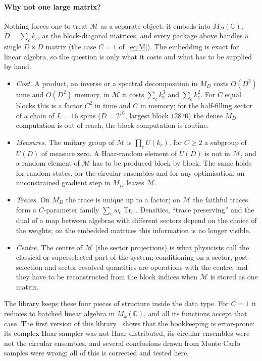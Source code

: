 \documentclass[11pt]{article}
\DeclareMathOperator{\Tr}{Tr}
\newcommand{\C}{\mathbb{C}}
\newcommand{\M}{\mathcal{M}}
\begin{document}
\paragraph{Why not one large matrix?} Nothing forces one to treat $\M$ as a separate object: it embeds into
$M_D(\C)$, $D=\sum_ck_c$, as the block-diagonal matrices, and every package above handles a single $D\times D$
matrix (the case $C=1$ of~\eqref{eq:M}). The embedding is exact for linear algebra, so the question is only what it
costs and what has to be supplied by hand.
\begin{itemize}\itemsep0pt
\item \emph{Cost.} A product, an inverse or a spectral decomposition in $M_D$ costs $O(D^3)$ time and $O(D^2)$ memory,
in $\M$ it costs $\sum_c k_c^3$ and $\sum_c k_c^2$. For $C$ equal blocks this is a factor $C^2$ in time and $C$ in
memory; for the half-filling sector of a chain of $L=16$ spins ($D=2^{16}$, largest block $12870$) the dense $M_D$
computation is out of reach, the block computation is routine.
\item \emph{Measures.} The unitary group of $\M$ is $\prod_cU(k_c)$, for $C\ge2$ a subgroup of $U(D)$ of measure zero. A Haar-random
element of $U(D)$ is not in $\M$, and a random element of $\M$ has to be produced block by block. The same holds for
random states, for the circular ensembles and for any optimisation: an unconstrained gradient step in $M_D$ leaves $\M$.
\item \emph{Traces.} On $M_D$ the trace is unique up to a factor; on $\M$ the faithful traces form a $C$-parameter
family $\sum_cw_c\Tr_c$. Densities, ``trace preserving'' and the dual of a map between algebras with different sectors
depend on the choice of the weights; on the embedded matrices this information is no longer visible.
\item \emph{Centre.} The centre of $\M$ (the sector projections) is what physicists call the classical or superselected
part of the system; conditioning on a sector, post-selection and sector-resolved quantities are operations with the
centre, and they have to be reconstructed from the block indices when $\M$ is stored as one matrix.
\end{itemize}
The library keeps these four pieces of structure inside the data type. For $C=1$ it reduces to batched
linear algebra in $M_k(\C)$, and all its functions accept that case. The first version of this
library~\cite{v1} shows that the bookkeeping is error-prone: its complex Haar sampler was not Haar distributed, its
circular ensembles were not the circular ensembles, and several conclusions drawn from Monte Carlo samples were wrong;
all of this is corrected and tested here.
\end{document}
